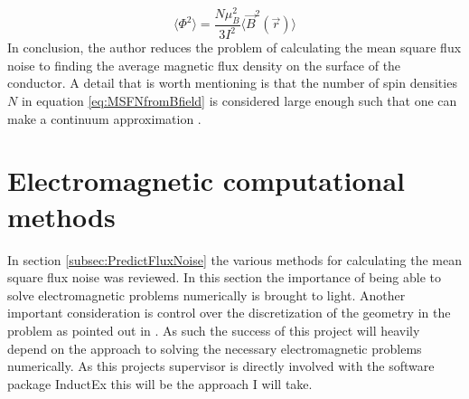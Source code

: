 \begin{equation}
    \langle \Phi^2 \rangle = \frac{N\mu_B^2}{3I^2}\langle \Vec{B}^2(\Vec{r}) \rangle
    \label{eq:MSFNfromBfield}
\end{equation}
In conclusion, the author reduces the problem of calculating the mean square flux noise to finding the average magnetic flux density on the surface of the conductor. A detail that is worth mentioning is that the number of spin densities $N$ in equation \ref{eq:MSFNfromBfield} is considered large enough such that one can make a continuum approximation \cite{fluxNoiseSquidsStevenAnton}.
\section{Electromagnetic computational methods}
In section \ref{subsec:PredictFluxNoise} the various methods for calculating the mean square flux noise was reviewed. In this section the importance of being able to solve electromagnetic problems numerically is brought to light. Another important consideration is control over the discretization of the geometry in the problem as pointed out in \cite{fluxNoiseSquidsStevenAnton}. As such the success of this project will heavily depend on the approach to solving the necessary electromagnetic problems numerically. As this projects supervisor is directly involved with the software package InductEx this will be the approach I will take. 
